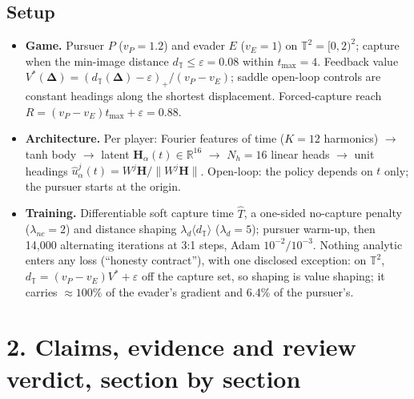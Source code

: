 \documentclass[10pt,a4paper]{article}
\newcommand{\T}{\mathbb{T}^2}
\newcommand{\dT}{d_{\mathbb{T}}}
\begin{document}
\subsection*{Setup}
\begin{itemize}
\item \textbf{Game.} Pursuer $P$ ($v_P=1.2$) and evader $E$ ($v_E=1$) on $\T=[0,2)^2$; capture when the min-image distance $\dT\le\varepsilon=0.08$ within $t_{\max}=4$. Feedback value $V^*(\boldsymbol\Delta)=(\dT(\boldsymbol\Delta)-\varepsilon)_+/(v_P-v_E)$; saddle open-loop controls are constant headings along the shortest displacement. Forced-capture reach $R=(v_P-v_E)t_{\max}+\varepsilon=0.88$.
\item \textbf{Architecture.} Per player: Fourier features of time ($K=12$ harmonics) $\to$ tanh body $\to$ latent $\boldsymbol{H}_\alpha(t)\in\mathbb R^{16}$ $\to$ $N_h=16$ linear heads $\to$ unit headings $\hat u^j_\alpha(t)=W^j\boldsymbol H/\|W^j\boldsymbol H\|$. Open-loop: the policy depends on $t$ only; the pursuer starts at the origin.
\item \textbf{Training.} Differentiable soft capture time $\widehat T$, a one-sided no-capture penalty ($\lambda_{nc}=2$) and distance shaping $\lambda_d\langle \dT\rangle$ ($\lambda_d=5$); pursuer warm-up, then 14{,}000 alternating iterations at 3:1 steps, Adam $10^{-2}/10^{-3}$. Nothing analytic enters any loss (``honesty contract''), with one disclosed exception: on $\T$, $\dT=(v_P-v_E)V^*+\varepsilon$ off the capture set, so shaping is value shaping; it carries $\approx100\%$ of the evader's gradient and 6.4\% of the pursuer's.
\end{itemize}

\section*{2. Claims, evidence and review verdict, section by section}
\end{document}
